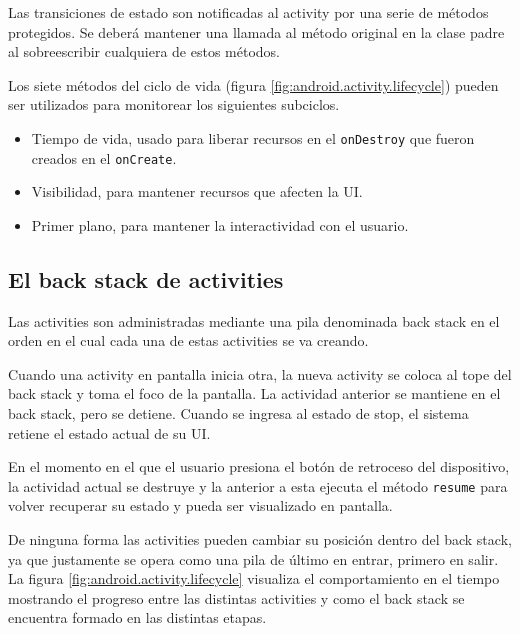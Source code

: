 Las transiciones de estado son notificadas al activity por una serie de m\'etodos protegidos. Se deber\'a mantener una llamada al m\'etodo original en la clase padre al sobreescribir cualquiera de estos m\'etodos.

Los siete m\'etodos del ciclo de vida (figura \ref{fig:android.activity.lifecycle}) pueden ser utilizados para monitorear los siguientes subciclos.

\begin{itemize}
\item Tiempo de vida, usado para liberar recursos en el \texttt{onDestroy} que fueron creados en el \texttt{onCreate}.
\item Visibilidad, para mantener recursos que afecten la UI.
\item Primer plano, para mantener la interactividad con el usuario.
\end{itemize}


\subsection{El back stack de activities}
\label{subsec:dev.activity.stack}

Las activities son administradas mediante una pila denominada back stack en el orden en el cual cada una de estas activities se va creando.

Cuando una activity en pantalla inicia otra, la nueva activity se coloca al tope del back stack y toma el foco de la pantalla. La actividad anterior se mantiene en el back stack, pero se detiene. Cuando se ingresa al estado de stop, el sistema retiene el estado actual de su \ac{UI}.

En el momento en el que el usuario presiona el bot\'on de retroceso del dispositivo, la actividad actual se destruye y la anterior a esta ejecuta el m\'etodo \texttt{resume} para volver recuperar su estado y pueda ser visualizado en pantalla.

De ninguna forma las activities pueden cambiar su posici\'on dentro del back stack, ya que justamente se opera como una pila de \'ultimo en entrar, primero en salir. La figura \ref{fig:android.activity.lifecycle} visualiza el comportamiento en el tiempo mostrando el progreso entre las distintas activities y como el back stack se encuentra formado en las distintas etapas.

